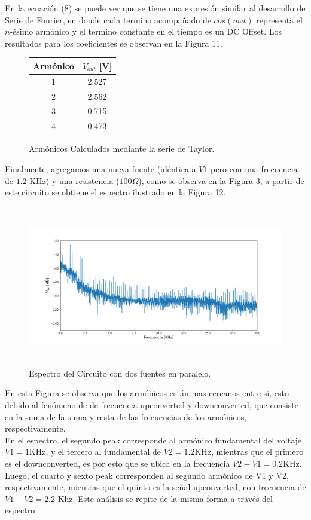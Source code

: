 \documentclass[letterpaper,oneside]{article}
\begin{document}
En la ecuación (8) se puede ver que se tiene una expresión similar al desarrollo de Serie de Fourier, en donde cada termino acompañado de $cos(n \omega t)$ representa el $n$-ésimo armónico y el termino constante en el tiempo es un DC Offset. Los resultados para los coeficientes se observan en la Figura 11.

\begin{figure}
\centering
\begin{tabular}{| c | c |}
\hline
Armónico & $V_{out}$ [V]  \\ \hline
1 & 2.527 \\
2 & 2.562 \\
3 & 0.715 \\
4 & 0.473 \\ \hline
\end{tabular}
\caption{Armónicos Calculados mediante la serie de Taylor.}
\end{figure}

Finalmente, agregamos una nueva fuente (idéntica a $V1$ pero con una frecuencia de $1.2$ KHz) y una resistencia ($100\Omega$), como se observa en la Figura 3, a partir de este circuito se obtiene el espectro ilustrado en la Figura 12.

\begin{figure}
  \centering
  \includegraphics[height=7cm]{../graficos/espectrocircuito4.png}
  \caption{Espectro del Circuito con dos fuentes en paralelo.}
\end{figure}

En esta Figura se observa que los armónicos están mas cercanos entre sí, esto debido al fenómeno de de frecuencia upconverted y downconverted, que consiste en la suma de la suma y resta de las frecuencias de los armónicos, respectivamente.\\

En el espectro. el segundo peak corresponde al armónico fundamental del voltaje $V1 = 1$KHz, y el tercero al fundamental de $V2=1.2$KHz, mientras que el primero es el downconverted, es por esto que se ubica en la frecuencia $V2 - V1 = 0.2$KHz. Luego, el cuarto y sexto peak corresponden al segundo armónico de V1 y V2, respectivamente, mientras que el quinto es la señal upconverted, con frecuencia de $V1+ V2 = 2.2$ Khz. Este análisis se repite de la misma forma a través del espectro.
\end{document}
